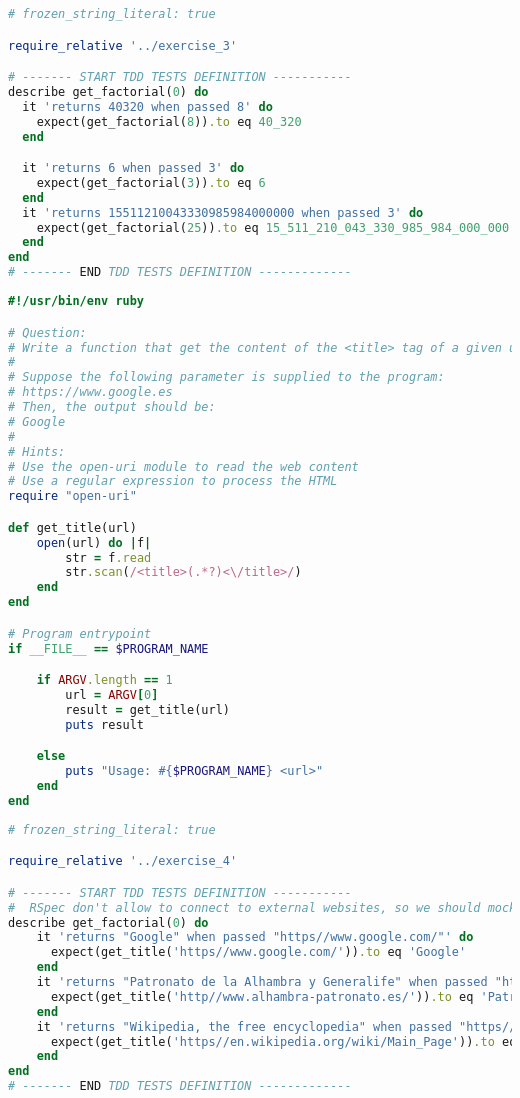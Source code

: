 \begin{lstlisting}[language=ruby,caption={exercise\_3\_spec.rb},captionpos=b]
# frozen_string_literal: true

require_relative '../exercise_3'

# ------- START TDD TESTS DEFINITION -----------
describe get_factorial(0) do
  it 'returns 40320 when passed 8' do
    expect(get_factorial(8)).to eq 40_320
  end

  it 'returns 6 when passed 3' do
    expect(get_factorial(3)).to eq 6
  end
  it 'returns 15511210043330985984000000 when passed 3' do
    expect(get_factorial(25)).to eq 15_511_210_043_330_985_984_000_000
  end
end
# ------- END TDD TESTS DEFINITION -------------
\end{lstlisting}

\begin{lstlisting}[language=ruby,caption={exercise\_4.rb},captionpos=b]
#!/usr/bin/env ruby

# Question:
# Write a function that get the content of the <title> tag of a given url
#
# Suppose the following parameter is supplied to the program:
# https://www.google.es
# Then, the output should be:
# Google
#
# Hints:
# Use the open-uri module to read the web content
# Use a regular expression to process the HTML
require "open-uri"

def get_title(url)
    open(url) do |f|
        str = f.read
        str.scan(/<title>(.*?)<\/title>/)
    end
end

# Program entrypoint
if __FILE__ == $PROGRAM_NAME

    if ARGV.length == 1
        url = ARGV[0]
        result = get_title(url)
        puts result

    else
        puts "Usage: #{$PROGRAM_NAME} <url>"
    end
end
\end{lstlisting}

\begin{lstlisting}[language=ruby,caption={exercise\_4\_spec.rb},captionpos=b]
# frozen_string_literal: true

require_relative '../exercise_4'

# ------- START TDD TESTS DEFINITION -----------
#  RSpec don't allow to connect to external websites, so we should mock the petition
describe get_factorial(0) do
    it 'returns "Google" when passed "https//www.google.com/"' do
      expect(get_title('https//www.google.com/')).to eq 'Google'
    end
    it 'returns "Patronato de la Alhambra y Generalife" when passed "http//www.alhambra-patronato.es/"' do
      expect(get_title('http//www.alhambra-patronato.es/')).to eq 'Patronato de la Alhambra y Generalife'
    end
    it 'returns "Wikipedia, the free encyclopedia" when passed "https//en.wikipedia.org/wiki/Main_Page"' do
      expect(get_title('https//en.wikipedia.org/wiki/Main_Page')).to eq 'Wikipedia, the free encyclopedia'
    end
end
# ------- END TDD TESTS DEFINITION -------------
\end{lstlisting}

